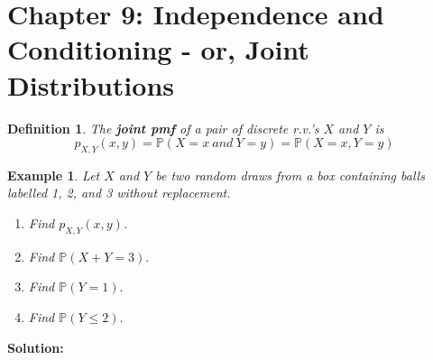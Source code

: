 \documentclass[12pt]{amsart}
\newtheorem{definition}[theorem]{Definition}
\newtheorem{example}[theorem]{Example}
\begin{document}
\setcounter{section}{9}
{\huge  
\section*{Chapter 9: Independence and Conditioning - or, Joint Distributions}
}

{\large 

\vspace{1cm}

\begin{definition}
The \textbf{joint pmf} of a pair of discrete r.v.'s $X$ and $Y$ is 
$$
p_{X,Y}(x,y) = \mathbb{P}(X=x\ and\ Y=y) = \mathbb{P}(X=x, Y=y)
$$ 
\end{definition}


\vspace{1cm}

\begin{example}\label{DrawsBox}
Let $X$ and $Y$ be two random draws from a box containing balls labelled 1, 2, and 3 without replacement. 

\begin{enumerate}
\item Find $p_{X,Y}(x,y)$.
\item Find $\mathbb{P}(X+Y=3).$
\item Find $\mathbb{P}(Y = 1).$
\item Find $\mathbb{P}(Y \leq 2).$
\end{enumerate}

\end{example}

\textbf{Solution:}







}
\end{document}
